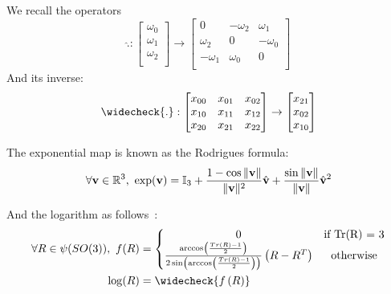 We recall the operators
\begin{equation}
\widehat{.}: \begin{bmatrix}
  \omega_0\\\omega_1\\\omega_2\\
\end{bmatrix}
\rightarrow
\begin{bmatrix}
  0 & -\omega_2 & \omega_1 \\
  \omega_2 & 0 & -\omega_0 \\
  -\omega_1 & \omega_0 & 0\\
\end{bmatrix}
\end{equation}
And its inverse:
\begin{equation}
\widecheck{.}: \begin{bmatrix}
    x_{00} & x_{01} & x_{02} \\
    x_{10} & x_{11} & x_{12} \\
    x_{20} & x_{21} & x_{22} \\
\end{bmatrix}
\rightarrow
\begin{bmatrix}
  x_{21}\\x_{02}\\x_{10}\\
\end{bmatrix}
\end{equation}


The exponential map is known as the Rodrigues formula:
\begin{equation}
  \forall \mathbf{v}\in\mathbb{R}^3,\ \exp(\mathbf{v}) = \mathbb{I}_3 + \frac{1-\cos \|\mathbf{v}\|}{\|\mathbf{v}\|^2} \hat{\mathbf{v}} + \frac{\sin \|\mathbf{v}\|}{\|\mathbf{v}\|} \hat{\mathbf{v}}^2\\
\end{equation}

And the logarithm as follows~\cite{merlhiot:thesis:2009}:
\begin{align}
\begin{split}
  \forall R\in\psi(SO(3)),\ f(R) &=
  \left\{ \begin{matrix}
  0 & \text{if Tr(R) = 3} \\
  \frac{\arccos\left(\frac{Tr(R)-1}{2}\right)}{2\sin\left(\arccos\left(\frac{Tr(R)-1}{2}\right)\right)}\left(R-R^T\right) & \text{otherwise} \\
  \end{matrix} \right.\\
  \log(R) &= \widecheck{f\left(R\right)}
\end{split}
\end{align}

